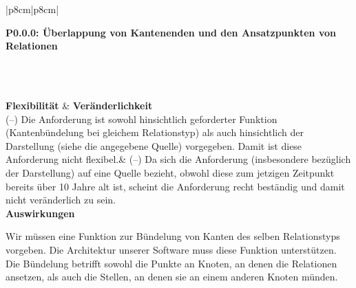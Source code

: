 \documentclass[enabledeprecatedfontcommands,fontsize=11pt,paper=a4,twoside]{scrartcl}
\newcounter{one}
\newcounter{two}[one]
\newcounter{three}[two]
\newcommand{\tone}{0\theone}
\newcommand{\ttwo}{0\thetwo}
\newcommand{\three}{\stepcounter{three}0\thethree}
\begin{document}
\newpage
\begin{tabular} {|p{8cm}|p{8cm}|}
	\hline
	 {\parbox{16cm}{\textbf{\hypertarget{cc}{P\tone.\ttwo.\three}: Überlappung von Kantenenden und den Ansatzpunkten von Relationen}} } \\  \hline\hline 
	\rule{0pt}{11ex}\\ [3ex] \hline
	\textbf{Flexibilität}  & \textbf{Veränderlichkeit} \\
	(–) Die Anforderung ist sowohl hinsichtlich geforderter Funktion (Kantenbündelung bei gleichem Relationstyp) als auch hinsichtlich der Darstellung (siehe die angegebene Quelle) vorgegeben. Damit ist diese Anforderung nicht flexibel.& 
	(–) Da sich die Anforderung (insbesondere bezüglich der Darstellung) auf eine Quelle bezieht, obwohl diese zum jetzigen Zeitpunkt bereits über 10 Jahre alt ist, scheint die Anforderung recht beständig und damit nicht veränderlich zu sein.\\
	\hline
	 {\textbf{Auswirkungen}} \\
	 {\parbox{16cm}{Wir müssen eine Funktion zur Bündelung von Kanten des selben Relationstyps vorgeben. Die Architektur unserer Software muss diese Funktion unterstützen. Die Bündelung betrifft sowohl die Punkte an Knoten, an denen die Relationen ansetzen, als auch die Stellen, an denen sie an einem anderen Knoten münden.} }\\[5ex] \hline
\end{tabular}
\end{document}
